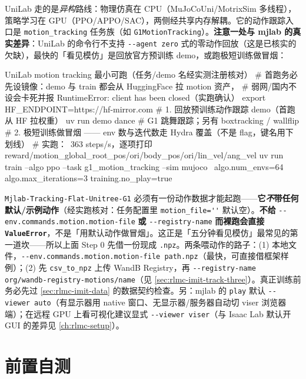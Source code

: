UniLab 走的是\emph{异构}路线：物理仿真在 CPU（MuJoCoUni/MotrixSim 多线程），策略学习在 GPU（PPO/APPO/SAC），两侧经共享内存解耦。它的动作跟踪入口是 \texttt{motion\_tracking} 任务族（如 \verb|G1MotionTracking|）。\textbf{注意一处与 mjlab 的真实差异}：UniLab 的命令行不支持 \verb|--agent zero| 式的零动作回放（这是已核实的欠缺），最快的「看见模仿」是回放官方预训练 demo，或跑极短训练做冒烟：

\begin{codebox}[bash]{UniLab motion tracking 最小可跑（任务/demo 名经实测注册核对）}
# 首跑务必先设镜像：demo 与 train 都会从 HuggingFace 拉 motion 资产，
#   弱网/国内不设会卡死并报 RuntimeError: client has been closed（实跑确认）
export HF_ENDPOINT=https://hf-mirror.com
# 1. 回放预训练动作跟踪 demo（首跑从 HF 拉权重）
uv run demo dance        # G1 跳舞跟踪；另有 boxtracking / wallflip
# 2. 极短训练做冒烟 —— env 数与迭代数走 Hydra 覆盖（不是 flag，键名用下划线）
#    实跑：~363 steps/s，逐项打印 reward/motion_global_root_pos/ori/body_pos/ori/lin_vel/ang_vel
uv run train --algo ppo --task g1_motion_tracking --sim mujoco \
    algo.num_envs=64 algo.max_iterations=3 training.no_play=true
\end{codebox}

\begin{note}
\verb|Mjlab-Tracking-Flat-Unitree-G1| 必须有一份动作数据才能起跑——\textbf{它\emph{不}带任何默认/示例动作}（经实跑核对：任务配置里 \verb|motion_file=''| 默认空）。\textbf{不给} \verb|--env.commands.motion.motion-file| \textbf{或} \verb|--registry-name| \textbf{而裸跑会直接 \texttt{ValueError}}，不是「用默认动作做冒烟」。这正是「五分钟看见模仿」最常见的第一道坎——所以上面 Step 0 先借一份现成 \verb|.npz|。两条喂动作的路子：(1) 本地文件，\verb|--env.commands.motion.motion-file path.npz|（最快，可直接借框架样例）；(2) 先 \verb|csv_to_npz| 上传 WandB Registry，再 \verb|--registry-name org/wandb-registry-motions/name|（见 \cref{sec:rlmc-imit-track-three}）。真正训练前务必先过 \cref{sec:rlmc-imit-data} 的数据契约检查。另：mjlab 的 \verb|play| 默认 \verb|--viewer auto|（有显示器用 native 窗口、无显示器/服务器自动切 viser 浏览器端）；在远程 GPU 上看可视化建议显式 \verb|--viewer viser|（与 Isaac Lab 默认开 GUI 的差异见 \cref{ch:rlmc-setup}）。
\end{note}

\section*{前置自测}
\label{sec:rlmc-imit-pretest}

